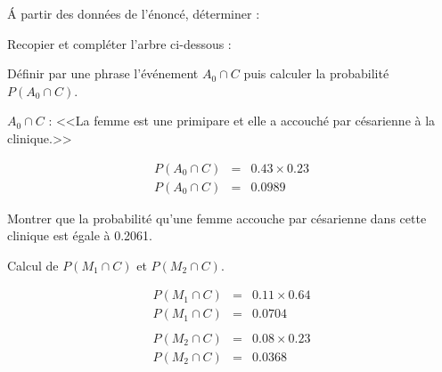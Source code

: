 \begin{questions}
	\question[1] \'A partir des données de l'énoncé, déterminer :
	
	\question[1] Recopier et compléter l'arbre ci-dessous :
	
	
	
	\begin{solution}
		
	\end{solution}
	
	\question[1] Définir par une phrase l'événement $A_0 \cap C$ puis calculer la probabilité $P(A_0 \cap C)$.
	\begin{solution}
		$A_0 \cap C$ : <<La femme est une primipare et elle a accouché par césarienne à la clinique.>>
		
		\begin{eqnarray*}
			P(A_0 \cap C) &=& \num{0.43} \times \num{0.23} \\
			P(A_0 \cap C) &=& \num{0.0989}
		\end{eqnarray*}
	\end{solution}
	
	\question[1] Montrer que la probabilité qu'une femme accouche par césarienne dans cette clinique est égale à \num{0.2061}.
	\begin{solution}
		Calcul de $P(M_1 \cap C)$ et $P(M_2 \cap C)$.
		
		\begin{eqnarray*}
			P(M_1 \cap C) &=& \num{0.11} \times \num{0.64} \\
			P(M_1 \cap C) &=& \num{0.0704} \\
			& & \\
			P(M_2 \cap C) &=& \num{0.08} \times \num{0.23} \\
			P(M_2 \cap C) &=& \num{0.0368} 			
		\end{eqnarray*}
	

\end{solution}
\end{questions}
